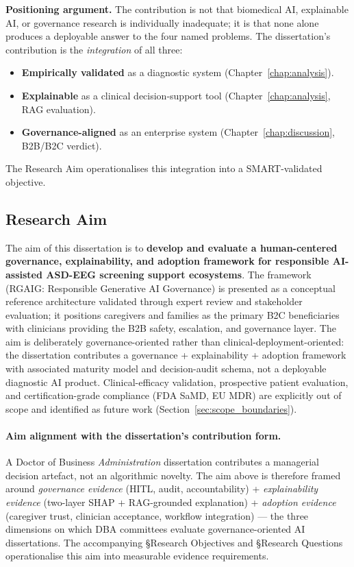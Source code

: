 \noindent\textbf{Positioning argument.} The contribution is not that biomedical AI, explainable AI, or governance research is individually inadequate; it is that none alone produces a deployable answer to the four named problems. The dissertation's contribution is the \emph{integration} of all three:
\begin{itemize}[leftmargin=*, itemsep=2pt]
    \item \textbf{Empirically validated} as a diagnostic system (Chapter~\ref{chap:analysis}).
    \item \textbf{Explainable} as a clinical decision-support tool (Chapter~\ref{chap:analysis}, RAG evaluation).
    \item \textbf{Governance-aligned} as an enterprise system (Chapter~\ref{chap:discussion}, B2B/B2C verdict).
\end{itemize}
\noindent The Research Aim operationalises this integration into a SMART-validated objective.

\subsection{Research Aim}
\label{sec:research_goal}

The aim of this dissertation is to \textbf{develop and evaluate a human-centered governance, explainability, and adoption framework for responsible AI-assisted ASD-EEG screening support ecosystems}. The framework (RGAIG: Responsible Generative AI Governance) is presented as a conceptual reference architecture validated through expert review and stakeholder evaluation; it positions caregivers and families as the primary B2C beneficiaries with clinicians providing the B2B safety, escalation, and governance layer. The aim is deliberately governance-oriented rather than clinical-deployment-oriented: the dissertation contributes a governance + explainability + adoption framework with associated maturity model and decision-audit schema, not a deployable diagnostic AI product. Clinical-efficacy validation, prospective patient evaluation, and certification-grade compliance (FDA SaMD, EU MDR) are explicitly out of scope and identified as future work (Section~\ref{sec:scope_boundaries}).

\paragraph{Aim alignment with the dissertation's contribution form.} A Doctor of Business \emph{Administration} dissertation contributes a managerial decision artefact, not an algorithmic novelty. The aim above is therefore framed around \emph{governance evidence} (HITL, audit, accountability) + \emph{explainability evidence} (two-layer SHAP + RAG-grounded explanation) + \emph{adoption evidence} (caregiver trust, clinician acceptance, workflow integration) --- the three dimensions on which DBA committees evaluate governance-oriented AI dissertations. The accompanying §Research Objectives and §Research Questions operationalise this aim into measurable evidence requirements.

